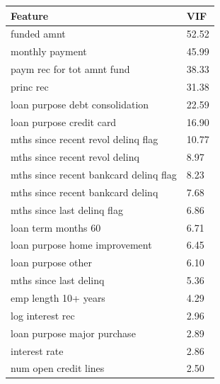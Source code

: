 \begin{tabular}{ll}
\toprule
Feature & VIF \\
\midrule
funded amnt & 52.52 \\
monthly payment & 45.99 \\
paym rec for tot amnt fund & 38.33 \\
princ rec & 31.38 \\
loan purpose debt consolidation & 22.59 \\
loan purpose credit card & 16.90 \\
mths since recent revol delinq flag & 10.77 \\
mths since recent revol delinq & 8.97 \\
mths since recent bankcard delinq flag & 8.23 \\
mths since recent bankcard delinq & 7.68 \\
mths since last delinq flag & 6.86 \\
loan term months 60 & 6.71 \\
loan purpose home improvement & 6.45 \\
loan purpose other & 6.10 \\
mths since last delinq & 5.36 \\
emp length 10+ years & 4.29 \\
log interest rec & 2.96 \\
loan purpose major purchase & 2.89 \\
interest rate & 2.86 \\
num open credit lines & 2.50 \\
\bottomrule
\end{tabular}
